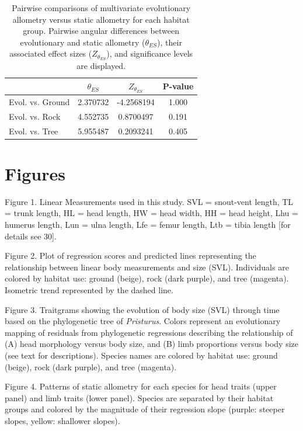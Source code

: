 \documentclass[
  11pt,
]{article}
\begin{document}
\begin{table}[H]

\caption{\label{tab:unnamed-chunk-3}Pairwise comparisons of multivariate evolutionary allometry versus static allometry for each habitat group. Pairwise angular differences between evolutionary and static allometry ($\theta_{ES}$), their associated effect sizes ($Z_{\theta_{ES}}$), and significance levels are displayed.}
\centering
\begin{tabular}[t]{lccc}
\toprule
  & $\theta_{ES}$ & $Z_{\theta_{ES}}$ & P-value\\
\midrule
Evol. vs. Ground & 2.370732 & -4.2568194 & 1.000\\
Evol. vs. Rock & 4.552735 & 0.8700497 & 0.191\\
Evol. vs. Tree & 5.955487 & 0.2093241 & 0.405\\
\bottomrule
\end{tabular}
\end{table}

\newpage

\hypertarget{figures}{%
\section{Figures}\label{figures}}

Figure 1. Linear Measurements used in this study. SVL = snout-vent
length, TL = trunk length, HL = head length, HW = head width, HH = head
height, Lhu = humerus length, Lun = ulna length, Lfe = femur length, Ltb
= tibia length {[}for details see 30{]}.

Figure 2. Plot of regression scores and predicted lines representing the
relationship between linear body measurements and size (SVL).
Individuals are colored by habitat use: ground (beige), rock (dark
purple), and tree (magenta). Isometric trend represented by the dashed
line.

Figure 3. Traitgrams showing the evolution of body size (SVL) through
time based on the phylogenetic tree of \emph{Pristurus}. Colors
represent an evolutionary mapping of residuals from phylogenetic
regressions describing the relationship of (A) head morphology versus
body size, and (B) limb proportions versus body size (see text for
descriptions). Species names are colored by habitat use: ground (beige),
rock (dark purple), and tree (magenta).

Figure 4. Patterns of static allometry for each species for head traits
(upper panel) and limb traits (lower panel). Species are separated by
their habitat groups and colored by the magnitude of their regression
slope (purple: steeper slopes, yellow: shallower slopes).
\end{document}
